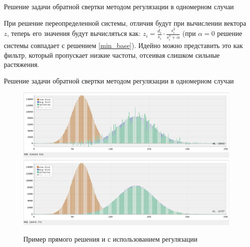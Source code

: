 \documentclass[fullscreen=true,russian,compress,%
	hyperref={unicode,bookmarks=false}]{presentation}
\begin{document}
\begin{frame}{Решение задачи обратной свертки методом регулязации в одномерном случаи}

При решение переопределенной системы, отличия будут при вычислении вектора $z$, теперь его значения будут вычисляться как:
$z_{i} = \frac{d_{i}}{s_{i}} \cdot \frac{s^2_{i}}{s^2_{i} + \alpha}$ (при $\alpha = 0$ решение системы
совпадает с решением \eqref{min_base}). Идейно можно представить это как фильтр, который пропускает низкие частоты, отсеивая слишком 
сильные растяжения.

\end{frame}

\begin{frame}{Решение задачи обратной свертки методом регулязации в одномерном случаи}
   \begin{figure}[h]
      \includegraphics[width=\linewidth]{images/example_without_regulazation.png}
      \includegraphics[width=\linewidth]{images/example_regulazation.png}
      \caption{Пример прямого решения и с использованием регулязации}
   \end{figure}
   
\end{frame}
\end{document}
